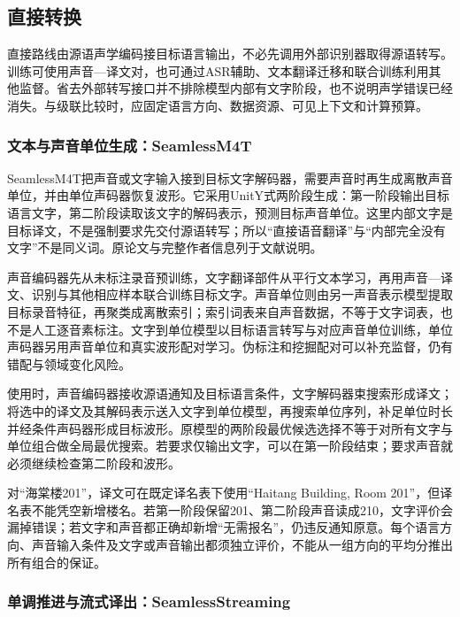 \subsection{直接转换}
\label{sec:nlp-speech-direct-translation}

直接路线由源语声学编码接目标语言输出，不必先调用外部识别器取得源语转写。训练可使用声音—译文对，也可通过ASR辅助、文本翻译迁移和联合训练利用其他监督。省去外部转写接口并不排除模型内部有文字阶段，也不说明声学错误已经消失。与级联比较时，应固定语言方向、数据资源、可见上下文和计算预算。

\subsubsection{文本与声音单位生成：SeamlessM4T}
\label{sec:nlp-speech-seamless}

SeamlessM4T把声音或文字输入接到目标文字解码器，需要声音时再生成离散声音单位，并由单位声码器恢复波形。它采用UnitY式两阶段生成：第一阶段输出目标语言文字，第二阶段读取该文字的解码表示，预测目标声音单位。这里内部文字是目标译文，不是强制要求先交付源语转写；所以“直接语音翻译”与“内部完全没有文字”不是同义词。原论文与完整作者信息列于文献说明。

声音编码器先从未标注录音预训练，文字翻译部件从平行文本学习，再用声音—译文、识别与其他相应样本联合训练目标文字。声音单位则由另一声音表示模型提取目标录音特征，再聚类成离散索引；索引词表来自声音数据，不等于文字词表，也不是人工逐音素标注。文字到单位模型以目标语言转写与对应声音单位训练，单位声码器另用声音单位和真实波形配对学习。伪标注和挖掘配对可以补充监督，仍有错配与领域变化风险。

使用时，声音编码器接收源语通知及目标语言条件，文字解码器束搜索形成译文；将选中的译文及其解码表示送入文字到单位模型，再搜索单位序列，补足单位时长并经条件声码器形成目标波形。原模型的两阶段最优候选选择不等于对所有文字与单位组合做全局最优搜索。若要求仅输出文字，可以在第一阶段结束；要求声音就必须继续检查第二阶段和波形。

对“海棠楼201”，译文可在既定译名表下使用“Haitang Building, Room 201”，但译名表不能凭空新增楼名。若第一阶段保留201、第二阶段声音读成210，文字评价会漏掉错误；若文字和声音都正确却新增“无需报名”，仍违反通知原意。每个语言方向、声音输入条件及文字或声音输出都须独立评价，不能从一组方向的平均分推出所有组合的保证。

\subsubsection{单调推进与流式译出：SeamlessStreaming}
\label{sec:nlp-speech-seamless-streaming}

